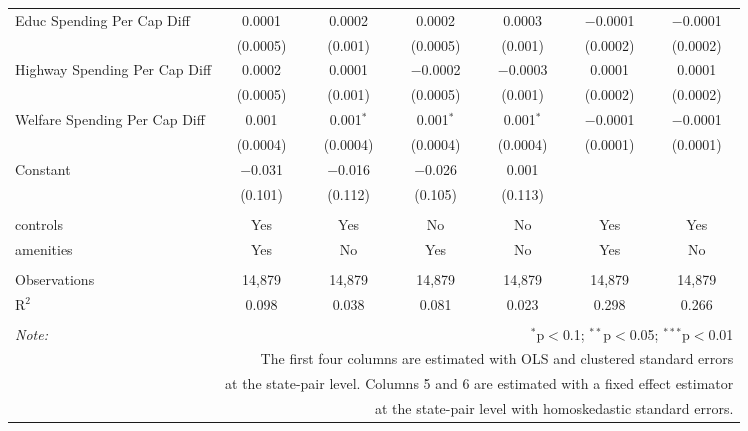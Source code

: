 \begin{table}[!htbp]
\begin{tabular}{@{\extracolsep{5pt}}lcccccc}
  Educ Spending Per Cap Diff & 0.0001 & 0.0002 & 0.0002 & 0.0003 & $-$0.0001 & $-$0.0001 \\ 
  & (0.0005) & (0.001) & (0.0005) & (0.001) & (0.0002) & (0.0002) \\ 
  Highway Spending Per Cap Diff & 0.0002 & 0.0001 & $-$0.0002 & $-$0.0003 & 0.0001 & 0.0001 \\ 
  & (0.0005) & (0.001) & (0.0005) & (0.001) & (0.0002) & (0.0002) \\ 
  Welfare Spending Per Cap Diff & 0.001 & 0.001$^{*}$ & 0.001$^{*}$ & 0.001$^{*}$ & $-$0.0001 & $-$0.0001 \\ 
  & (0.0004) & (0.0004) & (0.0004) & (0.0004) & (0.0001) & (0.0001) \\ 
  Constant & $-$0.031 & $-$0.016 & $-$0.026 & 0.001 &  &  \\ 
  & (0.101) & (0.112) & (0.105) & (0.113) &  &  \\ 
 \hline \\[-1.8ex] 
controls & Yes & Yes & No & No & Yes & Yes \\ 
amenities & Yes & No & Yes & No & Yes & No \\ 
\hline \\[-1.8ex] 
Observations & 14,879 & 14,879 & 14,879 & 14,879 & 14,879 & 14,879 \\ 
R$^{2}$ & 0.098 & 0.038 & 0.081 & 0.023 & 0.298 & 0.266 \\ 
\hline 
\hline \\[-1.8ex] 
\textit{Note:}  & \multicolumn{6}{r}{$^{*}$p$<$0.1; $^{**}$p$<$0.05; $^{***}$p$<$0.01} \\ 
 & \multicolumn{6}{r}{The first four columns are estimated with OLS and clustered standard errors} \\ 
 & \multicolumn{6}{r}{at the state-pair level. Columns 5 and 6 are estimated with a fixed effect estimator} \\ 
 & \multicolumn{6}{r}{at the state-pair level with homoskedastic standard errors.} \\ 
\end{tabular} 
\end{table} 
